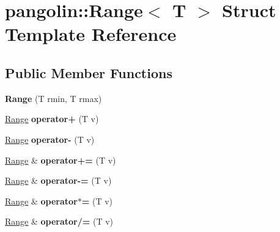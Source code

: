 \hypertarget{structpangolin_1_1_range}{}\section{pangolin\+:\+:Range$<$ T $>$ Struct Template Reference}
\label{structpangolin_1_1_range}
\subsection*{Public Member Functions}
\begin{DoxyCompactItemize}
\item 
{\bfseries Range} (T rmin, T rmax)\hypertarget{structpangolin_1_1_range_a68ab0b6208d5afbf3ef72f4b3a5d3340}{}\label{structpangolin_1_1_range_a68ab0b6208d5afbf3ef72f4b3a5d3340}

\item 
\hyperlink{structpangolin_1_1_range}{Range} {\bfseries operator+} (T v)\hypertarget{structpangolin_1_1_range_ae3b7cd34f2df378e8ee58291786fd00c}{}\label{structpangolin_1_1_range_ae3b7cd34f2df378e8ee58291786fd00c}

\item 
\hyperlink{structpangolin_1_1_range}{Range} {\bfseries operator-\/} (T v)\hypertarget{structpangolin_1_1_range_a07c65c99f9fd1ed257efaab345beb058}{}\label{structpangolin_1_1_range_a07c65c99f9fd1ed257efaab345beb058}

\item 
\hyperlink{structpangolin_1_1_range}{Range} \& {\bfseries operator+=} (T v)\hypertarget{structpangolin_1_1_range_a9afee6e4374ca1e287a0da8664442b62}{}\label{structpangolin_1_1_range_a9afee6e4374ca1e287a0da8664442b62}

\item 
\hyperlink{structpangolin_1_1_range}{Range} \& {\bfseries operator-\/=} (T v)\hypertarget{structpangolin_1_1_range_a47086ff33fb7a1714a03a97562868e68}{}\label{structpangolin_1_1_range_a47086ff33fb7a1714a03a97562868e68}

\item 
\hyperlink{structpangolin_1_1_range}{Range} \& {\bfseries operator$\ast$=} (T v)\hypertarget{structpangolin_1_1_range_ab37236fb30c01e03ffaeb6e0224091c9}{}\label{structpangolin_1_1_range_ab37236fb30c01e03ffaeb6e0224091c9}

\item 
\hyperlink{structpangolin_1_1_range}{Range} \& {\bfseries operator/=} (T v)\hypertarget{structpangolin_1_1_range_af32494456c60c208e3dc80461af9d512}{}\label{structpangolin_1_1_range_af32494456c60c208e3dc80461af9d512}


\end{DoxyCompactItemize}
